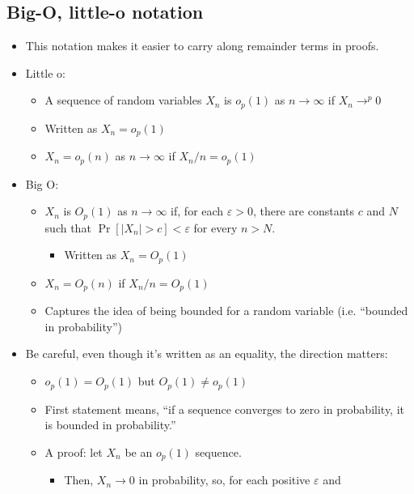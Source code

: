 \subsection{Big-O, little-o notation}
\begin{itemize}
\item This notation makes it easier to carry along remainder terms in
  proofs.
\item Little o:
\begin{itemize}
\item A sequence of random variables $X_n$ is $o_p(1)$ as $n → ∞$ if
  $X_n →^p 0$
\item Written as $X_n = o_p(1)$
\item $X_n = o_p(n)$ as $n → ∞$ if $X_n/n = o_p(1)$
\end{itemize}
\item Big O:
\begin{itemize}
\item $X_n$ is $O_p(1)$ as $n → ∞$ if, for each $ε > 0$, there are
  constants $c$ and $N$ such that $\Pr[|X_n| > c] < ε$ for every $n > N$.
\begin{itemize}
\item Written as $X_n = O_p(1)$
\end{itemize}
\item $X_n = O_p(n)$ if $X_n/n = O_p(1)$
\item Captures the idea of being bounded for a random variable
         (i.e. ``bounded in probability'')
\end{itemize}
\item Be careful, even though it's written as an equality, the direction matters:
\begin{itemize}
\item $o_p(1) = O_p(1)$ but $O_p(1) ≠ o_p(1)$
\item First statement means, ``if a sequence converges to zero in
         probability, it is bounded in probability.''
\item A proof: let $X_n$ be an $o_p(1)$ sequence.
\begin{itemize}
\item Then, $X_n → 0$ in probability, so, for each positive $ε$ and

\end{itemize}
\end{itemize}
\end{itemize}
